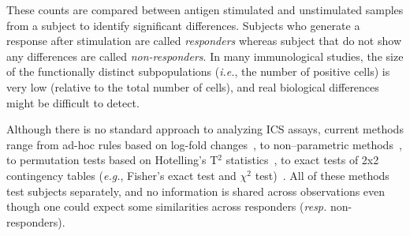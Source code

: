\documentclass[useAMS,referee,usenatbib]{biom}
\begin{document}
These counts are compared between antigen stimulated and unstimulated samples from a subject to identify significant differences. Subjects who generate a response after stimulation are called \textit{responders} whereas subject that do not show any differences are called \textit{non-responders}. 
In many immunological studies, the size of the functionally distinct subpopulations (\textit{i.e.}, the number of positive cells) is very low (relative to the total number of cells), and real biological differences might be difficult to detect. 

Although there is no standard approach to analyzing ICS assays, current methods range from ad-hoc rules based on log-fold changes~\citep{Trigona:2003}, to non--parametric methods~\citep{Sinclair:2004hs}, to permutation tests based on Hotelling's T$^2$ statistics~\citep{Nason:2006dx}, to exact tests of 2x2 contingency tables (\textit{e.g.}, Fisher's exact test and $\chi^2$ test)~\citep{Horton:2007tsa,Proschan:2009ks,Peiperl:2010ej,Nason:2006dx}.
All of these methods test subjects separately, and no information is shared across observations even though one could expect some similarities across responders (\textit{resp.} non-responders). %
\end{document}
